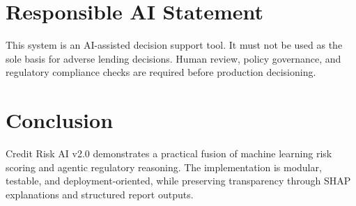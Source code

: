\documentclass[12pt,a4paper]{article}
\begin{document}
\section{Responsible AI Statement}
This system is an AI-assisted decision support tool. It must not be used as the sole basis for adverse lending decisions. Human review, policy governance, and regulatory compliance checks are required before production decisioning.

\section{Conclusion}
Credit Risk AI v2.0 demonstrates a practical fusion of machine learning risk scoring and agentic regulatory reasoning. The implementation is modular, testable, and deployment-oriented, while preserving transparency through SHAP explanations and structured report outputs.
\end{document}
